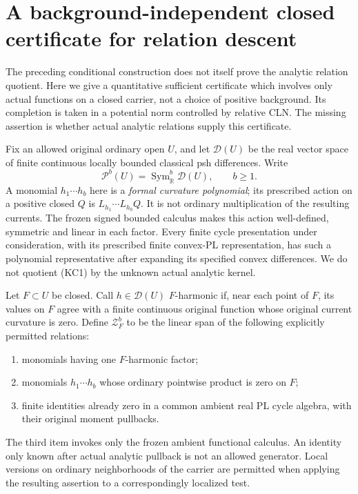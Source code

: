 \section{A background-independent closed certificate for relation descent}
\label{sec:r12-carrier-cln-certificates}

The preceding conditional construction does not itself prove the
analytic relation quotient. Here we give a quantitative sufficient
certificate which involves only actual functions on a closed carrier,
not a choice of positive background. Its completion is taken in a
potential norm controlled by relative CLN. The missing assertion is
whether actual analytic relations supply this certificate.

Fix an allowed original ordinary open \(U\), and let
\(\mathcal D(U)\) be the real vector space of finite continuous
locally bounded classical psh differences. Write
\[
                \mathcal P^b(U)=\operatorname{Sym}^b_{\mathbb R}
                                      \mathcal D(U),\qquad b\ge1.
 \tag{KC1}
\]
A monomial \(h_1\cdots h_b\) here is a \emph{formal curvature
polynomial}; its prescribed action on a positive closed \(Q\) is
\(L_{h_1}\cdots L_{h_b}Q\). It is not ordinary multiplication of
the resulting currents. The frozen signed bounded calculus makes
this action well-defined, symmetric and linear in each factor.
Every finite cycle presentation under consideration, with its
prescribed finite convex-PL representation, has such a polynomial
representative after expanding its specified convex differences.
We do not quotient (KC1) by the unknown actual analytic kernel.

Let \(F\subset U\) be closed. Call \(h\in\mathcal D(U)\)
\(F\)-harmonic if, near each point of \(F\), its values on \(F\)
agree with a finite continuous original function whose original
current curvature is zero. Define \(\mathcal Z_F^b\) to be the
linear span of the following explicitly permitted relations:
\begin{enumerate}
\item monomials having one \(F\)-harmonic factor;
\item monomials \(h_1\cdots h_b\) whose ordinary pointwise product
      is zero on \(F\);
\item finite identities already zero in a common ambient real
      PL cycle algebra, with their original moment pullbacks.
\end{enumerate}
The third item invokes only the frozen ambient functional calculus.
An identity only known after actual analytic pullback is not an
allowed generator. Local versions on ordinary neighborhoods of
the carrier are permitted when applying the resulting assertion
to a correspondingly localized test.

